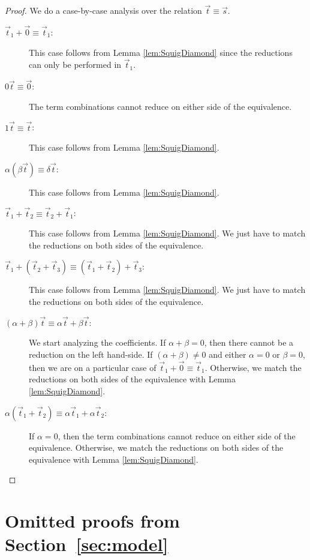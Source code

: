 \documentclass[a4paper,UKenglish,numberwithinsect,pdfa,anonymous]{lipics-v2021}
\theoremstyle{restatestyle}
\begin{document}
\begin{proof}
  We do a case-by-case analysis over the relation $\vec{t}\equiv\vec{s}$.
  \begin{description}
    \item[$\vec{t}_{1} + \vec0\equiv\vec{t}_{1}$:] This case follows from Lemma \ref{lem:SquigDiamond} since the reductions can only be performed in $\vec{t}_{1}$.
    
    \item[$0\vec{t}\equiv\vec{0}$:] The term combinations cannot reduce on either side of the equivalence.
    
    \item[$1\vec{t}\equiv\vec{t}$:] This case follows from Lemma \ref{lem:SquigDiamond}.
    
    \item[$\alpha(\beta \vec{t})\equiv\delta\vec{t}$:] This case follows from Lemma \ref{lem:SquigDiamond}.
    
    \item[$\vec{t}_{1}+\vec{t}_{2}\equiv\vec{t}_{2}+\vec{t}_{1}$:] This case follows from Lemma \ref{lem:SquigDiamond}. We just have to match the reductions on both sides of the equivalence.
    
    \item[$\vec{t}_{1}+(\vec{t}_{2}+\vec{t}_{3})\equiv(\vec{t}_{1}+\vec{t}_{2})+\vec{t}_{3}$:] This case follows from Lemma \ref{lem:SquigDiamond}. We just have to match the reductions on both sides of the equivalence.
    
    \item[$(\alpha+\beta)\vec{t}\equiv\alpha\vec{t} + \beta\vec{t}$:] We start analyzing the coefficients. If $\alpha+\beta = 0$, then there cannot be a reduction on the left hand-side. If $(\alpha + \beta)\neq 0$ and either $\alpha=0$ or $\beta=0$, then we are on a particular case of $\vec{t}_{1} + \vec0\equiv\vec{t}_{1}$. Otherwise, we match the reductions on both sides of the equivalence with Lemma \ref{lem:SquigDiamond}.
    
    \item[$\alpha(\vec{t}_{1}+\vec{t}_{2})\equiv\alpha\vec{t}_{1}+\alpha\vec{t}_{2}$:] If $\alpha=0$, then the term combinations cannot reduce on either side of the equivalence. Otherwise, we match the reductions on both sides of the equivalence with Lemma \ref{lem:SquigDiamond}.    
    \qedhere
  \end{description}
\end{proof}


\section{Omitted proofs from Section~\ref{sec:model}}\label{sec:appendixC}
\end{document}
